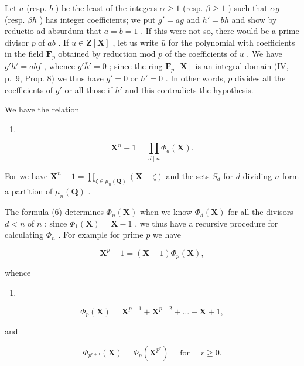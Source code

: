 Let \(a\) (resp. \(b\) ) be the least of the integers \(\alpha \geqslant 1\) (resp. \(\beta \geqslant 1\) ) such that \(\alpha g\) (resp. \(\beta h\) ) has integer coefficients; we put \(g' = ag\) and \(h' = bh\) and show by reductio ad absurdum that \(a = b = 1\) . If this were not so, there would be a prime divisor \(p\) of \(ab\) . If \(u \in \mathbf{Z}[\mathbf{X}]\) , let us write \(\bar{u}\) for the polynomial with coefficients in the field \(\mathbf{F}_p\) obtained by reduction mod \(p\) of the coefficients of \(u\) . We have \(g'h' = abf\) , whence \(\bar{g}'\bar{h}' = 0\) ; since the ring \(\mathbf{F}_p[\mathbf{X}]\) is an integral domain (IV, p.~9, Prop. 8) we thus have \(\bar{g}' = 0\) or \(\bar{h}' = 0\) . In other words, \(p\) divides all the coefficients of \(g'\) or all those if \(h'\) and this contradicts the hypothesis.

We have the relation

\begin{enumerate}
\def\labelenumi{(\arabic{enumi})}
\setcounter{enumi}{5}
\tightlist
\item
\end{enumerate}

\[
\mathbf {X} ^ {n} - 1 = \prod_ {d \mid n} \Phi_ {d} (\mathbf {X}).
\]

For we have \(\mathbf{X}^n - 1 = \prod_{\zeta \in \mu_n(\mathbf{Q})} (\mathbf{X} - \zeta)\) and the sets \(S_d\) for \(d\) dividing \(n\) form a partition of \(\mu_n(\mathbf{Q})\) .

The formula (6) determines \(\Phi_n(\mathbf{X})\) when we know \(\Phi_d(\mathbf{X})\) for all the divisors \(d < n\) of \(n\) ; since \(\Phi_1(\mathbf{X}) = \mathbf{X} - 1\) , we thus have a recursive procedure for calculating \(\Phi_n\) . For example for prime \(p\) we have

\[
\mathbf {X} ^ {p} - 1 = (\mathbf {X} - 1) \Phi_ {p} (\mathbf {X}),
\]

whence

\begin{enumerate}
\def\labelenumi{(\arabic{enumi})}
\setcounter{enumi}{6}
\tightlist
\item
\end{enumerate}

\[
\Phi_ {p} (\mathbf {X}) = \mathbf {X} ^ {p - 1} + \mathbf {X} ^ {p - 2} + \dots + \mathbf {X} + 1,
\]

and

\[
\Phi_ {p ^ {r + 1}} (\mathbf {X}) = \Phi_ {p} \left(\mathbf {X} ^ {p ^ {r}}\right) \quad \text { for } \quad r \geqslant 0.
\]

